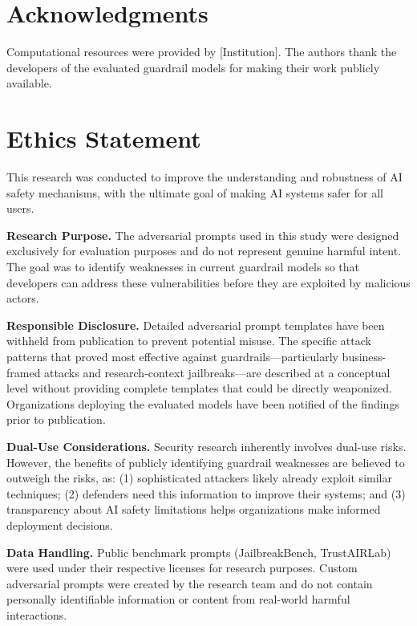 \documentclass{article}
\begin{document}
\section*{Acknowledgments}
Computational resources were provided by [Institution]. The authors thank the developers of the evaluated guardrail models for making their work publicly available.

\section*{Ethics Statement}
This research was conducted to improve the understanding and robustness of AI safety mechanisms, with the ultimate goal of making AI systems safer for all users.

\textbf{Research Purpose.} The adversarial prompts used in this study were designed exclusively for evaluation purposes and do not represent genuine harmful intent. The goal was to identify weaknesses in current guardrail models so that developers can address these vulnerabilities before they are exploited by malicious actors.

\textbf{Responsible Disclosure.} Detailed adversarial prompt templates have been withheld from publication to prevent potential misuse. The specific attack patterns that proved most effective against guardrails---particularly business-framed attacks and research-context jailbreaks---are described at a conceptual level without providing complete templates that could be directly weaponized. Organizations deploying the evaluated models have been notified of the findings prior to publication.

\textbf{Dual-Use Considerations.} Security research inherently involves dual-use risks. However, the benefits of publicly identifying guardrail weaknesses are believed to outweigh the risks, as: (1) sophisticated attackers likely already exploit similar techniques; (2) defenders need this information to improve their systems; and (3) transparency about AI safety limitations helps organizations make informed deployment decisions.

\textbf{Data Handling.} Public benchmark prompts (JailbreakBench, TrustAIRLab) were used under their respective licenses for research purposes. Custom adversarial prompts were created by the research team and do not contain personally identifiable information or content from real-world harmful interactions.
\end{document}
